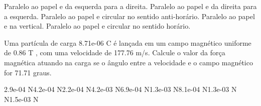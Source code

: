 \documentclass[12pt, addpoints]{exam}
\begin{document}
\begin{questions}
\begin{multicols*}{2}
\begin{choices}
\choice Paralelo ao papel e da esquerda para a direita. 
\choice Paralelo ao papel e da direita para a esquerda. 
\choice Paralelo ao papel e circular no sentido anti-horário. 
\choice Paralelo ao papel e na vertical. 
\choice Paralelo ao papel e circular no sentido horário. 
\end{choices}
\question Uma partícula de carga 8.71e-06 C é lançada em um campo magnético uniforme de    0.86 T , com uma velocidade de 177.76 m/s. Calcule o valor da força magnética atuando na carga se o ângulo entre a velocidade e o campo magnético for   71.71 graus.

\begin{oneparchoices}
\choice 2.9e-04 N\choice 4.2e-04 N\choice 2.2e-04 N\choice 4.2e-03 N\choice 6.9e-04 N\choice 1.3e-03 N\choice 8.1e-04 N\choice 1.3e-03 N N\choice 1.5e-03 N
\end{oneparchoices}\end{multicols*}
\end{questions}
\newpage
\end{document}

